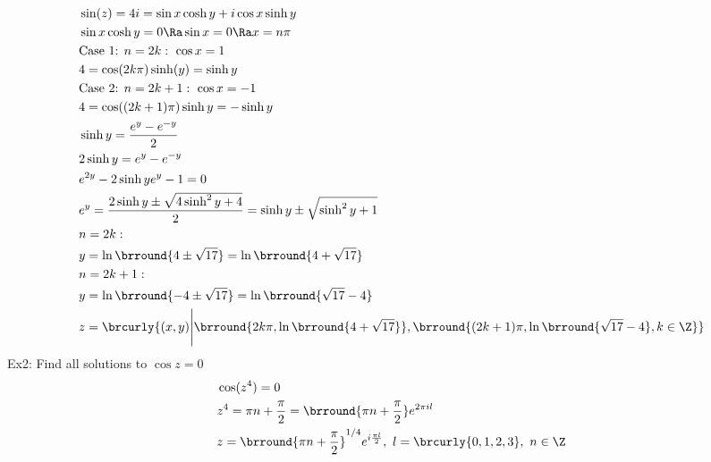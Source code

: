\begin{align*}
    &\sin(z)=4i=\sin x\cosh y+i\cos x\sinh y\\
    &\sin x\cosh y=0\Ra \sin x=0\Ra x=n\pi\\
    &\text{Case 1: }n=2k:\ \cos x=1\\
    &4=\cos(2k\pi)\sinh(y)=\sinh y\\
    &\text{Case 2: }n=2k+1:\ \cos x=-1\\
    &4=\cos((2k+1)\pi)\sinh y=-\sinh y\\
    &\sinh y=\frac{e^{y}-e^{-y}}{2}\\
    &2\sinh y=e^y-e^{-y}\\
    &e^{2y}-2\sinh y e^{y}-1=0\\
    &e^y=\frac{2\sinh y\pm\sqrt{4\sinh^2y+4}}{2}=\sinh y\pm \sqrt{\sinh^2y+1}\\
    &n=2k:\\
    &y=\ln\brround{4\pm\sqrt{17}}=\ln\brround{4+\sqrt{17}}\\
    &n=2k+1:\\
    &y=\ln\brround{-4\pm\sqrt{17}}=\ln\brround{\sqrt{17}-4}\\
    &z=\brcurly{(x,y)\Bigg\vert\brround{2k\pi,\ln\brround{4+\sqrt{17}}},\brround{(2k+1)\pi,\ln\brround{\sqrt{17}-4},k\in\Z}}
\end{align*}
Ex2: Find all solutions to $\cos z=0$
\begin{align*}
    &\cos(z^4)=0\\
    &z^4=\pi n+\frac{\pi}{2}=\brround{\pi n+\frac{\pi}{2}}e^{2\pi il}\\
    &z=\brround{\pi n+\frac{\pi}{2}}^{1/4}e^{i\frac{\pi l}{2}},\ l=\brcurly{0,1,2,3},\ n\in\Z
\end{align*}

